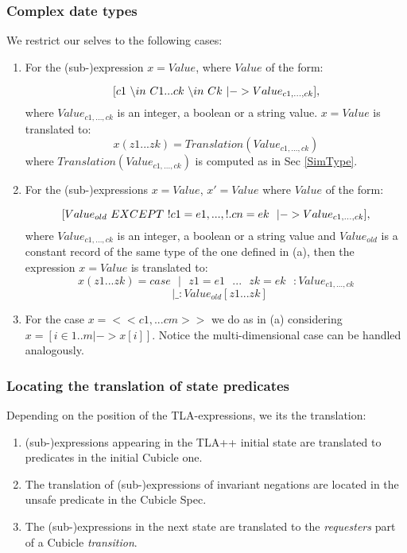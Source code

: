 \documentclass{article}
\theoremstyle{plain}
\numberwithin{equation}{section}
\begin{document}
\subsubsection{Complex date types}
We restrict our selves to the following cases: 

\begin{enumerate} 
\item  For  the (sub-)expression \emph{$x=Value$}, where \emph{$Value$} of the form:

$$ [c1  \text{ }\backslash in \text{ } C1 ... ck  \text{ }\backslash in \text{ } Ck \text{ }  \text|{-} >Value_{c1,\dots,ck} ],$$
 where $Value_{c1,\dots,ck}$ is an integer, a boolean or a string value. \emph{$x=Value$} is translated to: 
 $$ x(z1 ... zk) = Translation(Value_{c1,\dots,ck})  $$
 where $Translation(Value_{c1,\dots,ck})$ is computed as in Sec \ref{SimType}.

\item  For  the (sub-)expressions \emph{$x=Value$}, \emph{$x'=Value$} where \emph{$Value$} of the form:

$$ [Value_{old}  \text{ } EXCEPT \text{ } !c1 =e1, ..., !.cn =ek \text{ }  \text{ }  \text|{-} >Value_{c1,\dots,ck} ],$$
 where $Value_{c1,\dots,ck}$ is an integer, a boolean or a string value and $Value_{old}$ is a constant record of the same type of the one defined in (a), then the expression \emph{$x=Value$} is translated to: 
 $$ x(z1 ... zk) = case \text{ } | \text{ } z1 = e1\text{ }  ... \text{ } zk=ek\text{ }  : Value_{c1,\dots,ck} $$
 $$ \text{ } | \_ : Value_{old}[z1 ... zk] $$
 
\item For the case $x=<<c1,...cm >> $ we do as in (a) considering  $x=[ i \in 1 ..m |-> x[i] ] $. Notice the multi-dimensional case can be handled analogously.  
\end{enumerate} 


\subsubsection{Locating  the translation of state predicates}

Depending on the position of the TLA-expressions,  we its the translation: 

\begin{enumerate}
\item  (sub-)expressions appearing in the TLA++ initial state are translated to  predicates  in the initial Cubicle one.   
\item The translation of (sub-)expressions of invariant negations are located in the unsafe predicate in the Cubicle Spec.  
\item The (sub-)expressions in the next state are translated to the \emph{requesters} part of a Cubicle \emph{transition}. 


\end{enumerate}
\end{document}
